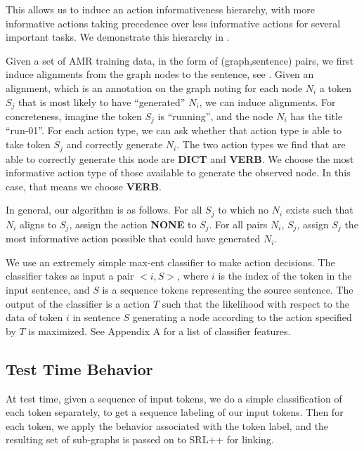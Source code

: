 \documentclass[11pt]{article}
\begin{document}

This allows us to induce an action informativeness hierarchy, with more informative actions taking precedence over less informative actions for several important tasks. We demonstrate this hierarchy in .


Given a set of AMR training data, in the form of (graph,sentence) pairs, we first induce alignments from the graph nodes to the sentence, see . Given an alignment, which is an annotation on the graph noting for each node $N_i$ a token $S_j$ that is most likely to have ``generated'' $N_i$, we can induce alignments. For concreteness, imagine the token $S_j$ is ``running'', and the node $N_i$ has the title ``run-01''. For each action type, we can ask whether that action type is able to take token $S_j$ and correctly generate $N_i$. The two action types we find that are able to correctly generate this node are \textbf{DICT} and \textbf{VERB}. We choose the most informative action type of those available to generate the observed node. In this case, that means we choose \textbf{VERB}.

In general, our algorithm is as follows. For all $S_j$ to which no $N_i$ exists such that $N_i$ aligns to $S_j$, assign the action \textbf{NONE} to $S_j$. For all pairs $N_i$, $S_j$, assign $S_j$ the most informative action possible that could have generated $N_i$. 


We use an extremely simple max-ent classifier to make action decisions. The classifier takes as input a pair $< i, S >$, where $i$ is the index of the token in the input sentence, and $S$ is a sequence tokens representing the source sentence. The output of the classifier is a action $T$ such that the likelihood with respect to the data of token $i$ in sentence $S$ generating a node according to the action specified by $T$ is maximized. See Appendix A for a list of classifier features.

\subsection{Test Time Behavior}

At test time, given a sequence of input tokens, we do a simple classification of each token separately, to get a sequence labeling of our input tokens. Then for each token, we apply the behavior associated with the token label, and the resulting set of sub-graphs is passed on to SRL++ for linking.
\end{document}
